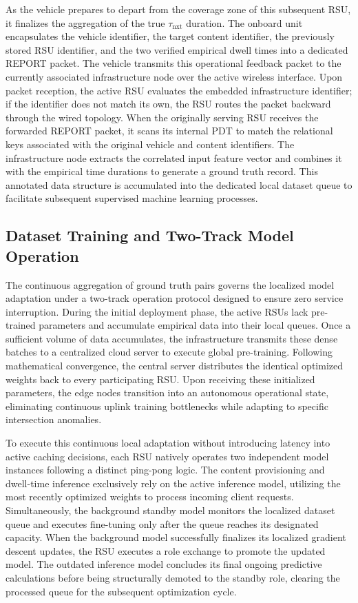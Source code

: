 \documentclass[journal]{IEEEtran}
\begin{document}
As the vehicle prepares to depart from the coverage zone of this subsequent RSU, it finalizes the aggregation of the true $\tau_{\text{nxt}}$ duration.
The onboard unit encapsulates the vehicle identifier, the target content identifier, the previously stored RSU identifier, and the two verified empirical dwell times into a dedicated REPORT packet.
The vehicle transmits this operational feedback packet to the currently associated infrastructure node over the active wireless interface.
Upon packet reception, the active RSU evaluates the embedded infrastructure identifier; if the identifier does not match its own, the RSU routes the packet backward through the wired topology.
When the originally serving RSU receives the forwarded REPORT packet, it scans its internal PDT to match the relational keys associated with the original vehicle and content identifiers.
The infrastructure node extracts the correlated input feature vector and combines it with the empirical time durations to generate a ground truth record.
This annotated data structure is accumulated into the dedicated local dataset queue to facilitate subsequent supervised machine learning processes.

\subsection{Dataset Training and Two-Track Model Operation} \label{sec.prop.E}
The continuous aggregation of ground truth pairs governs the localized model adaptation under a two-track operation protocol designed to ensure zero service interruption. During the initial deployment phase, the active RSUs lack pre-trained parameters and accumulate empirical data into their local queues. Once a sufficient volume of data accumulates, the infrastructure transmits these dense batches to a centralized cloud server to execute global pre-training. Following mathematical convergence, the central server distributes the identical optimized weights back to every participating RSU. Upon receiving these initialized parameters, the edge nodes transition into an autonomous operational state, eliminating continuous uplink training bottlenecks while adapting to specific intersection anomalies.

To execute this continuous local adaptation without introducing latency into active caching decisions, each RSU natively operates two independent model instances following a distinct ping-pong logic. The content provisioning and dwell-time inference exclusively rely on the active inference model, utilizing the most recently optimized weights to process incoming client requests. Simultaneously, the background standby model monitors the localized dataset queue and executes fine-tuning only after the queue reaches its designated capacity. When the background model successfully finalizes its localized gradient descent updates, the RSU executes a role exchange to promote the updated model. The outdated inference model concludes its final ongoing predictive calculations before being structurally demoted to the standby role, clearing the processed queue for the subsequent optimization cycle.
\end{document}
